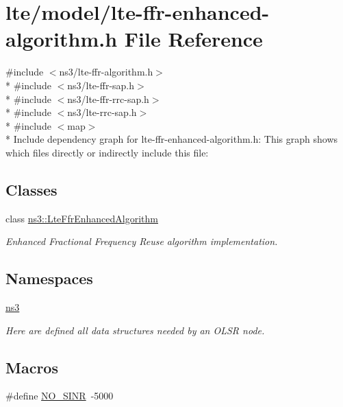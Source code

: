 \hypertarget{lte-ffr-enhanced-algorithm_8h}{}\section{lte/model/lte-\/ffr-\/enhanced-\/algorithm.h File Reference}
\label{lte-ffr-enhanced-algorithm_8h}
{\ttfamily \#include $<$ns3/lte-\/ffr-\/algorithm.\+h$>$}\\*
{\ttfamily \#include $<$ns3/lte-\/ffr-\/sap.\+h$>$}\\*
{\ttfamily \#include $<$ns3/lte-\/ffr-\/rrc-\/sap.\+h$>$}\\*
{\ttfamily \#include $<$ns3/lte-\/rrc-\/sap.\+h$>$}\\*
{\ttfamily \#include $<$map$>$}\\*
Include dependency graph for lte-\/ffr-\/enhanced-\/algorithm.h\+:
This graph shows which files directly or indirectly include this file\+:
\subsection*{Classes}
\begin{DoxyCompactItemize}
\item 
class \hyperlink{classns3_1_1LteFfrEnhancedAlgorithm}{ns3\+::\+Lte\+Ffr\+Enhanced\+Algorithm}
\begin{DoxyCompactList}\small\item\em Enhanced Fractional Frequency Reuse algorithm implementation. \end{DoxyCompactList}\end{DoxyCompactItemize}
\subsection*{Namespaces}
\begin{DoxyCompactItemize}
\item 
 \hyperlink{namespacens3}{ns3}
\begin{DoxyCompactList}\small\item\em Here are defined all data structures needed by an O\+L\+SR node. \end{DoxyCompactList}\end{DoxyCompactItemize}
\subsection*{Macros}
\begin{DoxyCompactItemize}
\item 
\#define \hyperlink{lte-ffr-enhanced-algorithm_8h_a520d71777be043568160c783a9c65fd5}{N\+O\+\_\+\+S\+I\+NR}~-\/5000
\end{DoxyCompactItemize}


